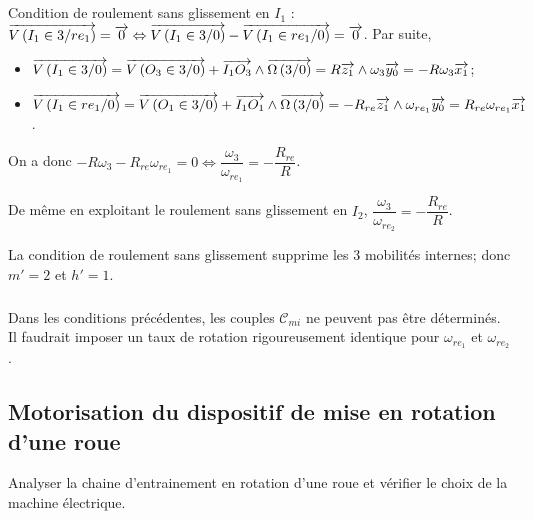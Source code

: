 \documentclass[10pt,fleqn]{article} %
\begin{document}
%

\subparagraph{}
Condition de roulement sans glissement en $I_1$ : $\overrightarrow{V\left( {I_1} \in {3}/{re_1}\right)} = \overrightarrow{0} \Leftrightarrow \overrightarrow{V\left( {I_1} \in {3}/{0}\right)}-\overrightarrow{V\left( {I_1} \in {re_1}/{0}\right)} = \overrightarrow{0}$. Par suite, 
\begin{itemize}
\item $\overrightarrow{V\left( {I_1} \in {3}/{0}\right)}=\overrightarrow{V\left( {O_3} \in {3}/{0}\right)}+\overrightarrow{I_1 O_3}\wedge \overrightarrow{\Omega\left( {3}/{0}\right)} = R\overrightarrow{z_1} \wedge \omega_3\overrightarrow{y_0}=-R\omega_3 \overrightarrow{x_1}$;
\item $\overrightarrow{V\left( {I_1} \in {re_1}/{0}\right)}=\overrightarrow{V\left( {O_1} \in {3}/{0}\right)}+\overrightarrow{I_1 O_1}\wedge \overrightarrow{\Omega\left( {3}/{0}\right)} = -R_{re}\overrightarrow{z_1} \wedge \omega_{re_1}\overrightarrow{y_0}=R_{re}\omega_{re_1} \overrightarrow{x_1}$.
\end{itemize}
On a donc $-R\omega_3 -R_{re}\omega_{re_1} =0 \Leftrightarrow\dfrac{\omega_3}{\omega_{re_1}}=-\dfrac{R_{re}}{R} $.

De même en exploitant le roulement sans glissement en $I_2$, $\dfrac{\omega_3}{\omega_{re_2}}=-\dfrac{R_{re}}{R} $. 

La condition de roulement sans glissement supprime les 3 mobilités internes; donc $m'=2$ et $h'=1$. 

\subparagraph{}
Dans les conditions précédentes, les couples $\mathcal{C}_{mi}$ ne peuvent pas être déterminés. Il faudrait imposer un taux de rotation rigoureusement identique pour $\omega_{re_1}$ et $\omega_{re_2}$. 


\subsection{Motorisation du dispositif de mise en rotation d'une roue}
\begin{obj}
Analyser la chaine d’entrainement en rotation d’une roue et vérifier le choix de la machine électrique.
\end{obj}
\end{document}
